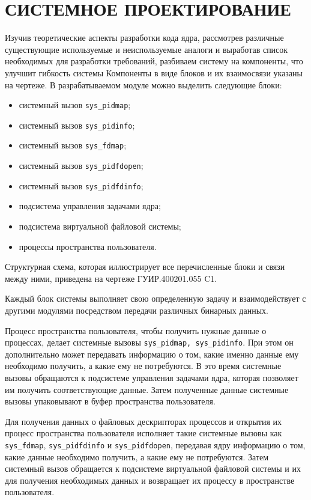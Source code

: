 \section{СИСТЕМНОЕ ПРОЕКТИРОВАНИЕ}
\label{sec:sys}

Изучив теоретические аспекты разработки кода ядра, рассмотрев различные
существующие используемые и неиспользуемые аналоги и выработав список
необходимых для разработки требований, разбиваем систему на компоненты, что
улучшит гибкость системы
Компоненты в виде блоков и их взаимосвязи указаны на чертеже.
В разрабатываемом модуле можно выделить следующие блоки:
\begin{itemize}
\item системный вызов \texttt{sys\_pidmap};
\item системный вызов \texttt{sys\_pidinfo};
\item системный вызов \texttt{sys\_fdmap};
\item системный вызов \texttt{sys\_pidfdopen};
\item системный вызов \texttt{sys\_pidfdinfo};
\item подсистема управления задачами ядра;
\item подсистема виртуальной файловой системы;
\item процессы пространства пользователя.
\end{itemize}

Структурная схема, которая иллюстрирует все перечисленные блоки и связи
между ними, приведена на чертеже ГУИР.400201.055 C1.

Каждый блок системы выполняет свою определенную задачу и взаимодействует с
другими модулями посредством передачи различных бинарных данных. 

Процесс пространства пользователя, чтобы получить нужные данные о процессах,
делает системные вызовы \texttt{sys\_pidmap, sys\_pidinfo}.
При этом он дополнительно может передавать информацию о том, какие именно данные
ему необходимо получить, а какие ему не потребуются.
В это время системные вызовы обращаются к подсистеме управления задачами ядра,
которая позволяет им получить соответствующие данные. Затем полученные данные
системные вызовы упаковывают в буфер пространства пользователя. 

Для получения данных о файловых дескрипторах процессов и открытия их процесс
пространства пользователя исполняет такие системные вызовы как
\texttt{sys\_fdmap}, \texttt{sys\_pidfdinfo} и \texttt{sys\_pidfdopen},
передавая ядру информацию о том, какие данные необходимо получить, а какие ему
не потребуются. Затем системный вызов обращается к подсистеме виртуальной
файловой системы и их для получения необходимых данных и возвращает их процессу
в пространстве пользователя.

